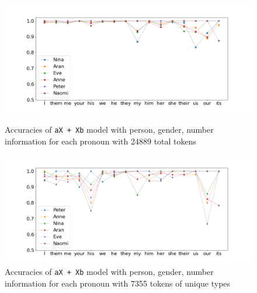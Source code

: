 \FloatBarrier
\begin{figure}[!h]
    \centering
   \includegraphics[scale = 0.45]{graph/aXXbpron24889.png}
    \caption{Accuracies of \texttt{aX + Xb} model with person, gender, number information for each pronoun with 24889 total tokens}
    \label{figg:15}
    \includegraphics[scale = 0.45]{graph/aXXbpron7355.png}
\caption{Accuracies of \texttt{aX + Xb} model with person, gender, number information for each pronoun with 7355 tokens of unique types}
\label{figg:16}
\end{figure}
\FloatBarrier

